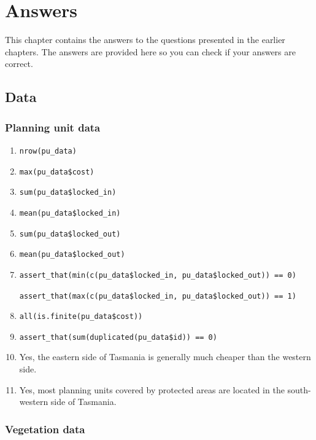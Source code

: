 \documentclass[12pt,]{book}
\providecommand{\tightlist}{%
  \setlength{\itemsep}{0pt}\setlength{\parskip}{0pt}}
\let\BeginKnitrBlock\begin \let\EndKnitrBlock\end
\begin{document}
\chapter{Answers}\label{answers}

This chapter contains the answers to the questions presented in the
earlier chapters. The answers are provided here so you can check if your
answers are correct.

\section{Data}\label{data}

\subsection{Planning unit data}\label{planning-unit-data-1}

\BeginKnitrBlock{rmdanswer}
\begin{enumerate}
\def\labelenumi{\arabic{enumi}.}
\tightlist
\item
  \texttt{nrow(pu\_data)}
\item
  \texttt{max(pu\_data\$cost)}
\item
  \texttt{sum(pu\_data\$locked\_in)}
\item
  \texttt{mean(pu\_data\$locked\_in)}
\item
  \texttt{sum(pu\_data\$locked\_out)}
\item
  \texttt{mean(pu\_data\$locked\_out)}
\item
  \texttt{assert\_that(min(c(pu\_data\$locked\_in,\ pu\_data\$locked\_out))\ ==\ 0)}
  \newline

  \texttt{assert\_that(max(c(pu\_data\$locked\_in,\ pu\_data\$locked\_out))\ ==\ 1)}
\item
  \texttt{all(is.finite(pu\_data\$cost))}
\item
  \texttt{assert\_that(sum(duplicated(pu\_data\$id))\ ==\ 0)}
\item
  Yes, the eastern side of Tasmania is generally much cheaper than the
  western side.
\item
  Yes, most planning units covered by protected areas are located in the
  south-western side of Tasmania.
\end{enumerate}
\EndKnitrBlock{rmdanswer}

\subsection{Vegetation data}\label{vegetation-data-1}
\end{document}
